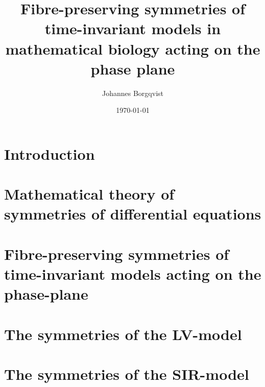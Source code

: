 \documentclass[12pt]{article}
\theoremstyle{definition}
\theoremstyle{remark}
\begin{document}
\title{\textbf{Fibre-preserving symmetries of time-invariant models in mathematical biology acting on the phase plane}}
\author{Johannes Borgqvist}
\date{\today}
\maketitle
\tableofcontents
\clearpage
\section{Introduction}

\section{Mathematical theory of symmetries of differential equations}

\section{Fibre-preserving symmetries of time-invariant models acting on the phase-plane}

\section{The symmetries of the LV-model}

\section{The symmetries of the SIR-model}

\end{document}

